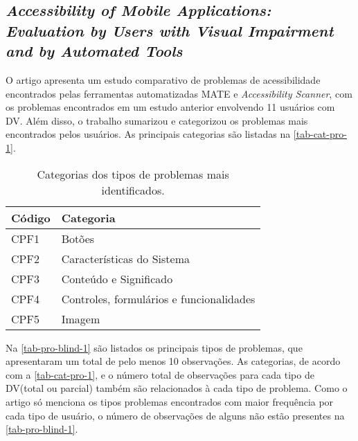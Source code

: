 \subsection{\emph{Accessibility of Mobile Applications: Evaluation by Users with Visual Impairment and by Automated Tools}}

O artigo apresenta um estudo comparativo de problemas de acessibilidade encontrados pelas ferramentas automatizadas MATE e \emph{Accessibility Scanner}, com os problemas encontrados em um estudo anterior envolvendo 11 usuários com DV\@.
Além disso, o trabalho sumarizou e categorizou os problemas mais encontrados pelos usuários.
As principais categorias são listadas na \autoref{tab-cat-pro-1}.

\begin{table}[htb]
  \begin{center}
    \ABNTEXfontereduzida
    \caption{Categorias dos tipos de problemas mais identificados.}
    \label{tab-cat-pro-1}
    \begin{tabular}{p{2.0cm}|p{7cm}}
      \textbf{Código} & \textbf{Categoria}                       \\
      \hline
      CPF1            & Botões                                   \\
      \hline
      CPF2            & Características do Sistema               \\
      \hline
      CPF3            & Conteúdo e Significado                   \\
      \hline
      CPF4            & Controles, formulários e funcionalidades \\
      \hline
      CPF5            & Imagem                                   \\
    \end{tabular}
  \end{center}
\end{table}

Na \autoref{tab-pro-blind-1} são listados os principais tipos de problemas, que apresentaram um total de pelo menos 10 observações.
As categorias, de acordo com a \autoref{tab-cat-pro-1}, e o número total de observações para cada tipo de DV\@ (total ou parcial) também são relacionados à cada tipo de problema.
Como o artigo só menciona os tipos problemas encontrados com maior frequência por cada tipo de usuário, o número de observações de alguns não estão presentes na \autoref{tab-pro-blind-1}.

